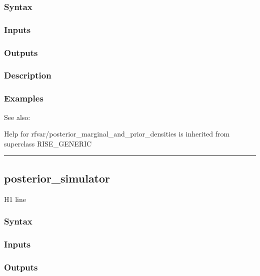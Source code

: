 \documentclass[letterpaper,10pt,english]{sphinxmanual}
\begin{document}
\subsubsection{Syntax}
\label{classes/models/@rfvar/rfvar:id81}

\subsubsection{Inputs}
\label{classes/models/@rfvar/rfvar:id82}

\subsubsection{Outputs}
\label{classes/models/@rfvar/rfvar:id83}

\subsubsection{Description}
\label{classes/models/@rfvar/rfvar:id84}

\subsubsection{Examples}
\label{classes/models/@rfvar/rfvar:id85}
See also:

Help for rfvar/posterior\_marginal\_and\_prior\_densities is inherited from superclass RISE\_GENERIC


\bigskip\hrule{}\bigskip



\subsection{posterior\_simulator}
\label{classes/models/@rfvar/rfvar:posterior-simulator}\label{classes/models/@rfvar/rfvar:id86}
H1 line


\subsubsection{Syntax}
\label{classes/models/@rfvar/rfvar:id87}

\subsubsection{Inputs}
\label{classes/models/@rfvar/rfvar:id88}

\subsubsection{Outputs}
\label{classes/models/@rfvar/rfvar:id89}
\end{document}
